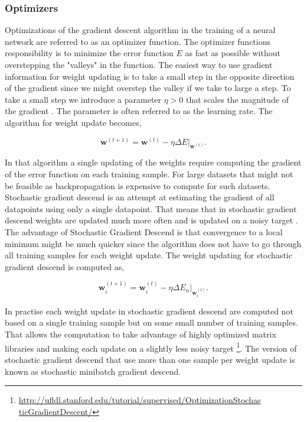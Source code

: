 \subsubsection{Optimizers}\label{sec:optimizers}

Optimizations of the gradient descent algorithm in the training of a neural
network are referred to as an optimizer function. The optimizer functions
responsibility is to minimize the error function $E$ as fast as possible
without overstepping the "valleys" in the function. The easiest way to use
gradient information for weight updating is to take a small step in the opposite
direction of the gradient since we might overstep the valley if we take to large
a step. To take a small step we introduce a parameter $\eta > 0$ that scales the
magnitude of the gradient \citep{Bishop}. The parameter is often referred to as
the learning rate. The algorithm for weight update becomes,

\begin{equation}
    \mathbf{w}^{(t+1)} =
        \mathbf{\mathbf{w}}^{(t)} -
        \eta\Delta E|_{\mathbf{w}^{(t)}}.
\end{equation}

In that algorithm a single updating of the weights require computing the
gradient of the error function on each training sample. For large datasets
that might not be feasible as backpropagation is expensive to compute for such
datasets. Stochastic gradient descend is an attempt at estimating the gradient
of all datapoints using only a single datapoint. That means that in stochastic
gradient descend weights are updated much more often and is updated on a noisy
target \citep{Bishop}. The advantage of Stochastic Gradient Descend is that
convergence to a local minimum might be much quicker since the algorithm does
not have to go through all training samples for each weight update. The weight
updating for stochastic gradient descend is computed as,

\begin{equation}
    \mathbf{w}^{(t+1)}_i =
        \mathbf{\mathbf{w}}^{(t)}_i -
        \eta\Delta E_n|_{\mathbf{w}^{(t)}_i}.
\end{equation}

In practise each weight update in stochastic gradient descend are computed
not based on a single training sample but on some small number of training
samples. That allows the computation to take advantage of highly optimized
matrix libraries and making each update on a slightly less noisy target
\footnote{\url{http://ufldl.stanford.edu/tutorial/supervised/OptimizationStochas
ticGradientDescent/}}. The version of stochastic gradient descend that use more
than one sample per weight update is known as stochastic minibatch gradient
descend.

